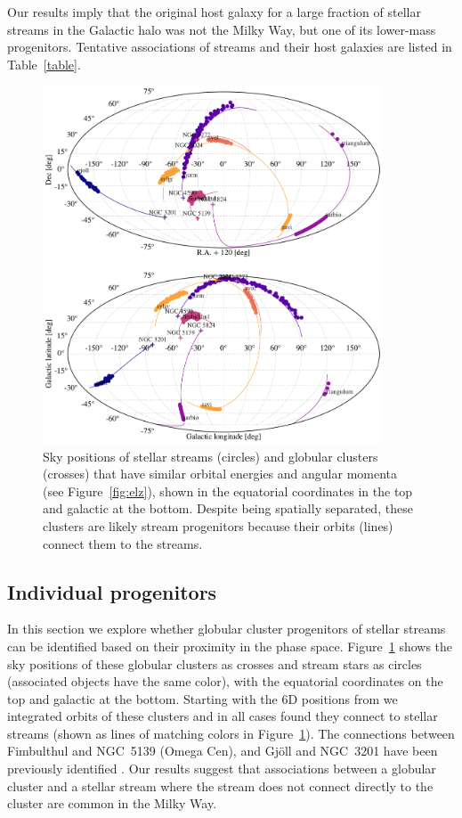 \documentclass[twocolumn]{aastex63}
\begin{document}
Our results imply that the original host galaxy for a large fraction of stellar streams in the Galactic halo was not the Milky Way, but one of its lower-mass progenitors.
Tentative associations of streams and their host galaxies are listed in Table~\ref{table}.


\begin{figure}
\begin{center}
\includegraphics[width=0.9\textwidth]{sky_orbits.pdf}
\end{center}
\caption{
Sky positions of stellar streams (circles) and globular clusters (crosses) that have similar orbital energies and angular momenta (see Figure~\ref{fig:elz}), shown in the equatorial coordinates in the top and galactic at the bottom.
Despite being spatially separated, these clusters are likely stream progenitors because their orbits (lines) connect them to the streams.
}
\label{fig:sky}
\end{figure}

\subsection{Individual progenitors}
\label{sec:progenitors}
In this section we explore whether globular cluster progenitors of stellar streams can be identified based on their proximity in the phase space.
Figure~\ref{fig:sky} shows the sky positions of these globular clusters as crosses and stream stars as circles (associated objects have the same color), with the equatorial coordinates on the top and galactic at the bottom.
Starting with the 6D positions from \citet{baumgardt2019} we integrated orbits of these clusters and in all cases found they connect to stellar streams (shown as lines of matching colors in Figure~\ref{fig:sky}).
The connections between Fimbulthul and NGC~5139 (Omega Cen), and Gj\" oll and NGC~3201 have been previously identified \citep[respectively]{ibata2019b, hansen2020}.
Our results suggest that associations between a globular cluster and a stellar stream where the stream does not connect directly to the cluster are common in the Milky Way.
\end{document}
